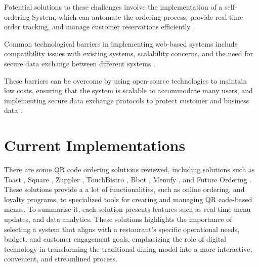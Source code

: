Potential solutions to these challenges involve the implementation of a self-ordering System, which can automate the ordering process, provide real-time order tracking, and manage customer reservations efficiently \cite{7}.

Common technological barriers in implementing web-based systems include compatibility issues with existing systems, scalability concerns, and the need for secure data exchange between different systems \cite{2}.

These barriers can be overcome by using open-source technologies to maintain low costs, ensuring that the system is scalable to accommodate many users, and implementing secure data exchange protocols to protect customer and business data \cite{2}. 

\section{Current Implementations}
There are some QR code ordering solutions reviewed, including solutions such as Toast \cite{8}, Square \cite{9}, Zuppler \cite{10}, TouchBistro \cite{11}, Bbot \cite{12}, Menufy \cite{13}, and Future Ordering \cite{14}. These solutions provide a a lot of functionalities, such as online ordering, and loyalty programs, to specialized tools for creating and managing QR code-based menus. To summarise it, each solution presents features such as real-time menu updates, and data analytics. These solutions highlights the importance of selecting a system that aligns with a restaurant's specific operational needs, budget, and customer engagement goals, emphasizing the role of digital technology in transforming the traditional dining model into a more interactive, convenient, and streamlined process.

